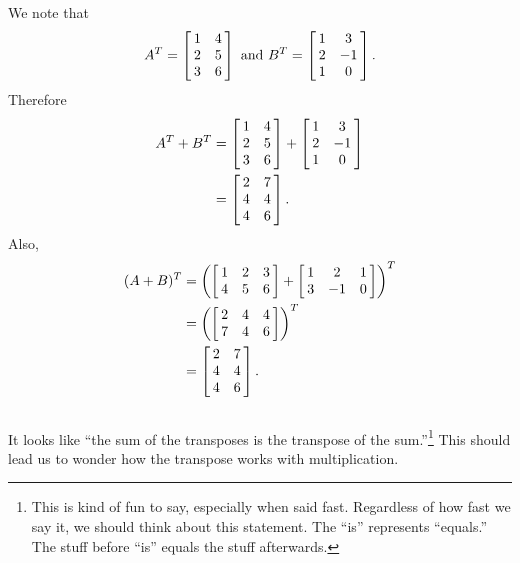 \enlargethispage{3\baselineskip}

{We note that $$\ttat = \bmx{cc}1&4\\2&5\\3&6\emx\ \text{and}\ \ttbt = \bmx{cc}1&3\\2&-1\\1&0\emx.$$ Therefore 
\begin{align*} \ttat + \ttbt &= \bmx{cc}1&4\\2&5\\3&6\emx+\bmx{cc}1&3\\2&-1\\1&0\emx \\
&= \bmx{cc}2&7\\4&4\\4&6\emx.\end{align*}
Also, 
\begin{align*} (\tta+\ttb)^T &= \left(\bmx{ccc}1&2&3\\4&5&6\emx+\bmx{ccc}1&2&1\\3&-1&0\emx \right)^T \\
&= \left( \bmx{ccc}2&4&4\\7&4&6\emx\right)^T \\
&= \bmx{cc}2&7\\4&4\\4&6\emx.\end{align*}
\ } \\ %

It looks like ``the sum of the transposes is the transpose of the sum.''\footnote{This is kind of fun to say, especially when said fast. Regardless of how fast we say it, we should think about this statement. The ``is'' represents ``equals.'' The stuff before ``is'' equals the stuff afterwards.} This should lead us to wonder how the transpose works with multiplication.\\

